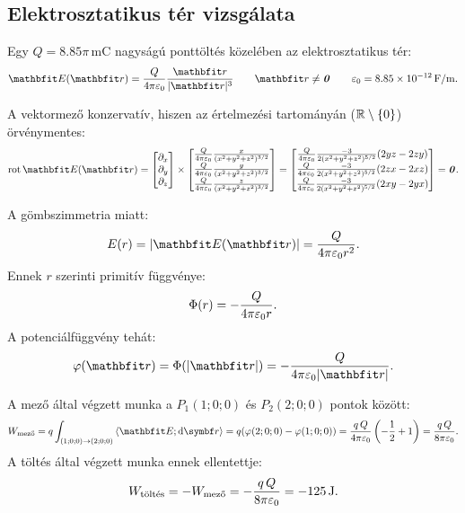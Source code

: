 \documentclass{szb-practice}
\begin{document}
\subsection{Elektrosztatikus tér vizsgálata}

Egy $Q = \num{8.85}\pi\,\si{\milli\coulomb}$ nagyságú ponttöltés
közelében az elektrosztatikus tér:
$$
  \rvec E(\coordvec) = \frac{Q}{4\pi \varepsilon_0}
  \frac{\coordvec}{|\coordvec|^3}
  \qquad
  \coordvec \neq \nvec
  \qquad \varepsilon_0 = \SI[per-mode=symbol]{8,85e-12}{\farad\per\meter}
  \text.
$$

A vektormező konzervatív, hiszen az értelmezési tartományán
($\mathbb{R} \setminus \{0\}$) örvénymentes:
$$
  \rot \rvec E(\coordvec) = \begin{bmatrix}
    \partial_x \\ \partial_y \\ \partial_z
  \end{bmatrix} \times \begin{bmatrix}
    \frac{Q}{4\pi \varepsilon_0} \frac{x}{(x^2 + y^2 + z^2)^{3/2}} \\
    \frac{Q}{4\pi \varepsilon_0} \frac{y}{(x^2 + y^2 + z^2)^{3/2}} \\
    \frac{Q}{4\pi \varepsilon_0} \frac{z}{(x^2 + y^2 + z^2)^{3/2}}
  \end{bmatrix} = \begin{bmatrix}
    \frac{Q}{4\pi \varepsilon_0} \frac{-3}{2(x^2 + y^2 + z^2)^{5/2}} (2yz - 2zy) \\
    \frac{Q}{4\pi \varepsilon_0} \frac{-3}{2(x^2 + y^2 + z^2)^{5/2}} (2zx - 2xz) \\
    \frac{Q}{4\pi \varepsilon_0} \frac{-3}{2(x^2 + y^2 + z^2)^{5/2}} (2xy - 2yx)
  \end{bmatrix} = \nvec
  \text.
$$

A gömbszimmetria miatt:
$$
  E(r) = |\rvec E(\coordvec)| = \frac{Q}{4\pi \varepsilon_0 r^2}
  \text.
$$
Ennek $r$ szerinti primitív függvénye:
$$
  \Phi(r) = -\frac{Q}{4\pi \varepsilon_0 r}
  \text.
$$
A potenciálfüggvény tehát:
$$
  \varphi(\coordvec) = \Phi(|\coordvec|) = -\frac{Q}{4\pi \varepsilon_0 |\coordvec|}
  \text.
$$

A mező által végzett munka a $P_1(1; 0; 0)$ és $P_2(2; 0; 0)$ pontok között:
$$
  W_\text{mező}
  = q \int_{(1;0;0) \to (2;0;0)} \scalar{\rvec E}{\dd \curvevec}
  = q (\varphi(2; 0; 0) - \varphi(1; 0; 0))
  = \frac{q \, Q}{4\pi \varepsilon_0} \left(-\frac{1}{2} + 1\right)
  = \frac{q \, Q}{8\pi \varepsilon_0}
  \text.
$$
A töltés által végzett munka ennek ellentettje:
$$
  W_\text{töltés} = -W_\text{mező}
  = -\frac{q \, Q}{8\pi \varepsilon_0}
  = \SI{-125}{\joule}
  \text.
$$
\end{document}
